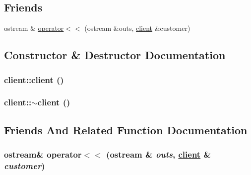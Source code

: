 \subsection*{Friends}
\begin{CompactItemize}
\item 
ostream \& \hyperlink{classclient_9f09335faadcf7eaacdcd326c26f5d99}{operator$<$$<$} (ostream \&outs, \hyperlink{classclient}{client} \&customer)
\end{CompactItemize}


\subsection{Constructor \& Destructor Documentation}
\hypertarget{classclient_b53a10e7f29eac1a359e54efc484e96e}{
\subsubsection[client]{\setlength{\rightskip}{0pt plus 5cm}client::client ()}}
\label{classclient_b53a10e7f29eac1a359e54efc484e96e}


\hypertarget{classclient_f615a256c40006da0684c8baae2da7cb}{
\subsubsection[$\sim$client]{\setlength{\rightskip}{0pt plus 5cm}client::$\sim$client ()}}
\label{classclient_f615a256c40006da0684c8baae2da7cb}




\subsection{Friends And Related Function Documentation}
\hypertarget{classclient_9f09335faadcf7eaacdcd326c26f5d99}{
\subsubsection[operator$<$$<$]{\setlength{\rightskip}{0pt plus 5cm}ostream\& operator$<$$<$ (ostream \& {\em outs}, \hyperlink{classclient}{client} \& {\em customer})}}
\label{classclient_9f09335faadcf7eaacdcd326c26f5d99}




